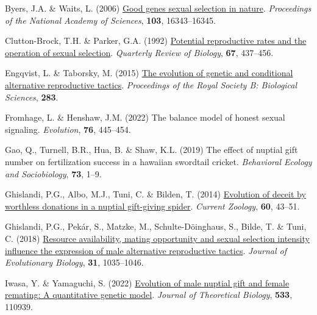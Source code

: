 \documentclass[
]{article}
\newlength{\cslhangindent}
\newlength{\cslentryspacingunit} %
\newenvironment{CSLReferences}[2] %
 {%
  \setlength{\parindent}{0pt}
  \ifodd #1
  \let\oldpar\par
  \def\par{\hangindent=\cslhangindent\oldpar}
  \fi
  \setlength{\parskip}{#2\cslentryspacingunit}
 }%
 {}
\begin{document}
\begin{CSLReferences}{0}{0}
\leavevmode{}%
Byers, J.A. \& Waits, L. (2006)
\href{https://doi.org/10.1073/pnas.0608184103}{{Good genes sexual
selection in nature}}. \emph{Proceedings of the National Academy of
Sciences}, \textbf{103}, 16343--16345.

\leavevmode{}%
Clutton-Brock, T.H. \& Parker, G.A. (1992)
\href{https://doi.org/10.1086/417793}{{Potential reproductive rates and
the operation of sexual selection}}. \emph{Quarterly Review of Biology},
\textbf{67}, 437--456.

\leavevmode{}%
Engqvist, L. \& Taborsky, M. (2015)
\href{https://doi.org/10.1098/rspb.2015.2945}{{The evolution of genetic
and conditional alternative reproductive tactics}}. \emph{Proceedings of
the Royal Society B: Biological Sciences}, \textbf{283}.

\leavevmode{}%
Fromhage, L. \& Henshaw, J.M. (2022) The balance model of honest sexual
signaling. \emph{Evolution}, \textbf{76}, 445--454.

\leavevmode{}%
Gao, Q., Turnell, B.R., Hua, B. \& Shaw, K.L. (2019) The effect of
nuptial gift number on fertilization success in a hawaiian swordtail
cricket. \emph{Behavioral Ecology and Sociobiology}, \textbf{73}, 1--9.

\leavevmode{}%
Ghislandi, P.G., Albo, M.J., Tuni, C. \& Bilden, T. (2014)
\href{https://www.ptonline.com/articles/how-to-get-better-mfi-results}{{Evolution
of deceit by worthless donations in a nuptial gift-giving spider}}.
\emph{Current Zoology}, \textbf{60}, 43--51.

\leavevmode{}%
Ghislandi, P.G., Pekár, S., Matzke, M., Schulte-Döinghaus, S., Bilde, T.
\& Tuni, C. (2018) \href{https://doi.org/10.1111/jeb.13284}{{Resource
availability, mating opportunity and sexual selection intensity
influence the expression of male alternative reproductive tactics}}.
\emph{Journal of Evolutionary Biology}, \textbf{31}, 1035--1046.

\leavevmode{}%
Iwasa, Y. \& Yamaguchi, S. (2022)
\href{https://doi.org/10.1016/j.jtbi.2021.110939}{{Evolution of male
nuptial gift and female remating: A quantitative genetic model}}.
\emph{Journal of Theoretical Biology}, \textbf{533}, 110939.


\end{CSLReferences}
\end{document}
